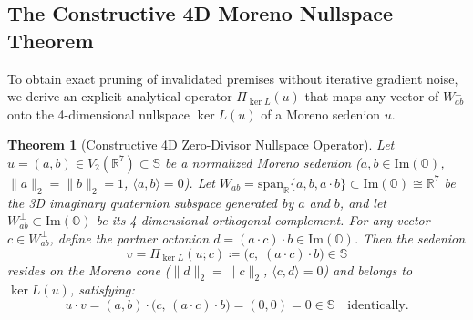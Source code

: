 \documentclass[11pt,a4paper]{article}
\newtheorem{theorem}{Theorem}[section]
\theoremstyle{definition}
\theoremstyle{remark}
\newcommand{\R}{\mathbb{R}}
\newcommand{\Oc}{\mathbb{O}}
\newcommand{\Se}{\mathbb{S}}
\newcommand{\ImPart}{\mathrm{Im}}
\newcommand{\PiNull}{\Pi_{\ker L}}
\begin{document}
\subsection{The Constructive 4D Moreno Nullspace Theorem}
To obtain exact pruning of invalidated premises without iterative gradient noise, we derive an explicit analytical operator $\PiNull(u)$ that maps any vector of $W_{ab}^\perp$ onto the 4-dimensional nullspace $\ker L(u)$ of a Moreno sedenion $u$.

\begin{theorem}[Constructive 4D Zero-Divisor Nullspace Operator]
\label{thm:nullspace}
Let $u = (a, b) \in V_2(\R^7) \subset \Se$ be a normalized Moreno sedenion ($a, b \in \ImPart(\Oc)$, $\|a\|_2 = \|b\|_2 = 1$, $\langle a, b \rangle = 0$). Let $W_{ab} = \mathrm{span}_{\R}\{a, b, a \cdot b\} \subset \ImPart(\Oc) \cong \R^7$ be the 3D imaginary quaternion subspace generated by $a$ and $b$, and let $W_{ab}^\perp \subset \ImPart(\Oc)$ be its 4-dimensional orthogonal complement. For any vector $c \in W_{ab}^\perp$, define the partner octonion $d = (a \cdot c) \cdot b \in \ImPart(\Oc)$. Then the sedenion
\begin{equation}
\label{eq:nullspace_projector}
v = \PiNull(u; c) \coloneqq \big(c, \; (a \cdot c) \cdot b\big) \in \Se
\end{equation}
resides on the Moreno cone ($\|d\|_2 = \|c\|_2$, $\langle c, d \rangle = 0$) and belongs to $\ker L(u)$, satisfying:
\begin{equation}
\label{eq:exact_annihilation}
u \cdot v = (a, b) \cdot \big(c, \, (a \cdot c) \cdot b\big) = (0, 0) = 0 \in \Se \quad \text{identically.}
\end{equation}
\end{theorem}
\end{document}
